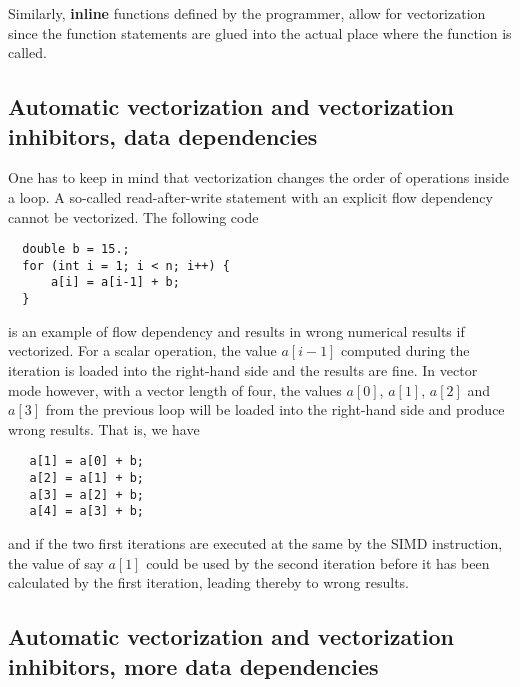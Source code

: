 Similarly, \textbf{inline} functions defined by the programmer, allow for vectorization since the function statements are glued into the actual place where the function is called. 

\subsection*{Automatic vectorization and vectorization inhibitors, data dependencies}

One has to keep in mind that vectorization changes the order of operations inside a loop. A so-called
read-after-write statement with an explicit flow dependency cannot be vectorized. The following code





\begin{verbatim}
  double b = 15.;
  for (int i = 1; i < n; i++) {
      a[i] = a[i-1] + b;
  }

\end{verbatim}

is an example of flow dependency and results in wrong numerical results if vectorized. For a scalar operation, the value $a[i-1]$ computed during the iteration is loaded into the right-hand side and the results are fine. In vector mode however, with a vector length of four, the values $a[0]$, $a[1]$, $a[2]$ and $a[3]$ from the previous loop will be loaded into the right-hand side and produce wrong results. That is, we have





\begin{verbatim}
   a[1] = a[0] + b;
   a[2] = a[1] + b;
   a[3] = a[2] + b;
   a[4] = a[3] + b;

\end{verbatim}

and if the two first iterations are  executed at the same by the SIMD instruction, the value of say $a[1]$ could be used by the second iteration before it has been calculated by the first iteration, leading thereby to wrong results.

\subsection*{Automatic vectorization and vectorization inhibitors, more data dependencies}

